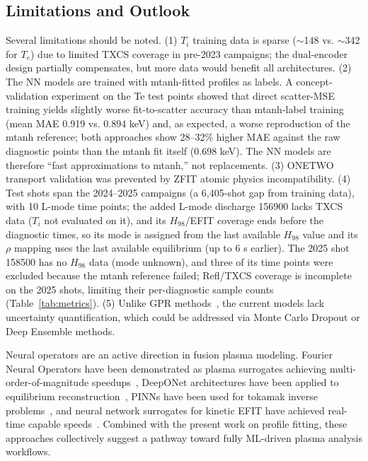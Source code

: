 \documentclass[a4paper,12pt]{article}
\begin{document}
\subsection{Limitations and Outlook}

Several limitations should be noted. (1) $T_i$ training data is sparse ($\sim$148 vs. $\sim$342 for $T_e$) due to limited TXCS coverage in pre-2023 campaigns; the dual-encoder design partially compensates, but more data would benefit all architectures. (2) The NN models are trained with mtanh-fitted profiles as labels. A concept-validation experiment on the Te test points showed that direct scatter-MSE training yields slightly worse fit-to-scatter accuracy than mtanh-label training (mean MAE 0.919 vs. 0.894 keV) and, as expected, a worse reproduction of the mtanh reference; both approaches show 28--32\% higher MAE against the raw diagnostic points than the mtanh fit itself (0.698 keV). The NN models are therefore ``fast approximations to mtanh,'' not replacements. (3) ONETWO transport validation was prevented by ZFIT atomic physics incompatibility. (4) Test shots span the 2024--2025 campaigns (a 6,405-shot gap from training data), with 10 L-mode time points; the added L-mode discharge 156900 lacks TXCS data ($T_i$ not evaluated on it), and its $H_{98}$/EFIT coverage ends before the diagnostic times, so its mode is assigned from the last available $H_{98}$ value and its $\rho$ mapping uses the last available equilibrium (up to 6 s earlier). The 2025 shot 158500 has no $H_{98}$ data (mode unknown), and three of its time points were excluded because the mtanh reference failed; Refl/TXCS coverage is incomplete on the 2025 shots, limiting their per-diagnostic sample counts (Table~\ref{tab:metrics}). (5) Unlike GPR methods~\cite{gpr_profiles,gpr_review}, the current models lack uncertainty quantification, which could be addressed via Monte Carlo Dropout or Deep Ensemble methods.

Neural operators are an active direction in fusion plasma modeling. Fourier Neural Operators have been demonstrated as plasma surrogates achieving multi-order-of-magnitude speedups~\cite{fno_plasma}, DeepONet architectures have been applied to equilibrium reconstruction~\cite{deeponet_equilibrium}, PINNs have been used for tokamak inverse problems~\cite{pinn_tokamak,pinn_east}, and neural network surrogates for kinetic EFIT have achieved real-time capable speeds~\cite{nn_efit_surrogate}. Combined with the present work on profile fitting, these approaches collectively suggest a pathway toward fully ML-driven plasma analysis workflows.
\end{document}
